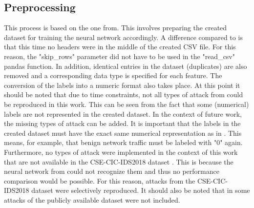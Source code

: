 \documentclass[conference]{IEEEtran}
\begin{document}
\subsection{Preprocessing}
This process is based on the one from\cite{max1}. This involves preparing the created dataset for training the neural network accordingly. A difference compared to \cite{max1} is that this time no headers were in the middle of the created CSV file. For this reason, the "skip\_rows" parameter did not have to be used in the "read\_csv" pandas function. In addition, identical entries in the dataset (duplicates) are also removed and a corresponding data type is specified for each feature. The conversion of the labels into a numeric format also takes place. At this point it should be noted that due to time constraints, not all types of attack from \cite{max2} could be reproduced in this work. This can be seen from the fact that some (numerical) labels are not represented in the created dataset. In the context of future work, the missing types of attack can be added. It is important that the labels in the created dataset must have the exact same numerical representation as in \cite{max1}. This means, for example, that benign network traffic must be labeled with "0" again. Furthermore, no types of attack were implemented in the context of this work that are not available in the CSE-CIC-IDS2018 dataset \cite{max2}. This is because the neural network from \cite{max1} could not recognize them and thus no performance comparison would be possible. For this reason, attacks from the CSE-CIC-IDS2018 dataset \cite{max2} were selectively reproduced. It should also be noted that in \cite{max1} some attacks of the publicly available dataset were not included.
\end{document}
